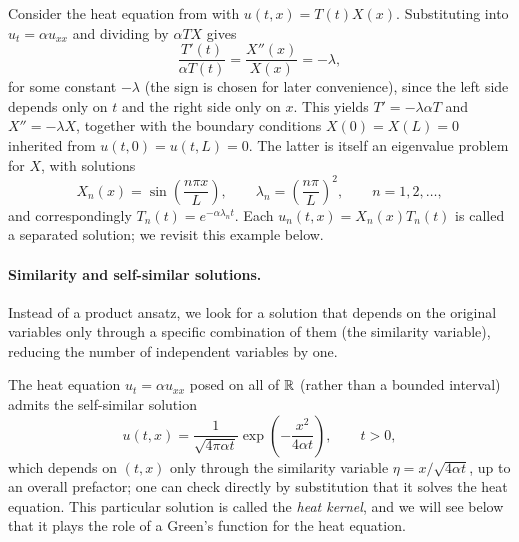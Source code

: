 \begin{example}
    \label{ex:heat-separation}
    Consider the heat equation from  with
    $u(t,x) = T(t)X(x)$. Substituting into $u_t = \alpha u_{xx}$ and
    dividing by $\alpha TX$ gives
    \begin{equation*}
        \frac{T'(t)}{\alpha T(t)} = \frac{X''(x)}{X(x)} = -\lambda,
    \end{equation*}
    for some constant $-\lambda$ (the sign is chosen for later
    convenience), since the left side depends only on $t$ and the right
    side only on $x$. This yields $T' = -\lambda \alpha T$ and $X'' =
    -\lambda X$, together with the boundary conditions $X(0)=X(L)=0$
    inherited from $u(t,0)=u(t,L)=0$. The latter is itself an
    eigenvalue problem for $X$, with solutions
    \begin{equation*}
        X_n(x) = \sin\left( \frac{n\pi x}{L} \right), \qquad \lambda_n =
        \left( \frac{n\pi}{L} \right)^2, \qquad n=1,2,\ldots,
    \end{equation*}
    and correspondingly $T_n(t) = e^{-\alpha \lambda_n t}$. Each
    $u_n(t,x) = X_n(x)T_n(t)$ is called a separated solution; we
    revisit this example below.
\end{example}

\paragraph{Similarity and self-similar solutions.}
Instead of a product ansatz, we look for a solution that depends on
the original variables only through a specific combination of them
(the similarity variable), reducing the number of independent
variables by one.

\begin{example}
    The heat equation $u_t = \alpha u_{xx}$ posed on all of $\mathbb{R}$
    (rather than a bounded interval) admits the self-similar solution
    \begin{equation*}
        u(t,x) = \frac{1}{\sqrt{4\pi\alpha t}} \exp\left( -\frac{x^2}{4
        \alpha t} \right), \qquad t > 0,
    \end{equation*}
    which depends on $(t,x)$ only through the similarity variable
    $\eta = x/\sqrt{4\alpha t}$, up to an overall prefactor; one can
    check directly by substitution that it solves the heat equation.
    This particular solution is called the \emph{heat kernel}, and we
    will see below that it plays the role of a Green's function for
    the heat equation.
\end{example}

